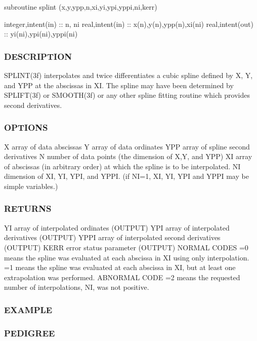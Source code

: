subroutine splint (x,y,ypp,n,xi,yi,ypi,yppi,ni,kerr)

integer,intent(in) \+:\+: n, ni real,intent(in) \+:\+: x(n),y(n),ypp(n),xi(ni) real,intent(out) \+:\+: yi(ni),ypi(ni),yppi(ni)

\subsubsection*{D\+E\+S\+C\+R\+I\+P\+T\+I\+ON}

S\+P\+L\+I\+N\+T(3f) interpolates and twice differentiates a cubic spline defined by X, Y, and Y\+PP at the abscissas in XI. The spline may have been determined by S\+P\+L\+I\+F\+T(3f) or S\+M\+O\+O\+T\+H(3f) or any other spline fitting routine which provides second derivatives.

\subsubsection*{O\+P\+T\+I\+O\+NS}

X array of data abscissas Y array of data ordinates Y\+PP array of spline second derivatives N number of data points (the dimension of X,Y, and Y\+PP) XI array of abscissas (in arbitrary order) at which the spline is to be interpolated. NI dimension of XI, YI, Y\+PI, and Y\+P\+PI. (if NI=1, XI, YI, Y\+PI and Y\+P\+PI may be simple variables.) \subsubsection*{R\+E\+T\+U\+R\+NS}

YI array of interpolated ordinates (O\+U\+T\+P\+UT) Y\+PI array of interpolated derivatives (O\+U\+T\+P\+UT) Y\+P\+PI array of interpolated second derivatives (O\+U\+T\+P\+UT) K\+E\+RR error status parameter (O\+U\+T\+P\+UT) N\+O\+R\+M\+AL C\+O\+D\+ES =0 means the spline was evaluated at each abscissa in XI using only interpolation. =1 means the spline was evaluated at each abscissa in XI, but at least one extrapolation was performed. A\+B\+N\+O\+R\+M\+AL C\+O\+DE =2 means the requested number of interpolations, NI, was not positive. \subsubsection*{E\+X\+A\+M\+P\+LE}

\subsubsection*{P\+E\+D\+I\+G\+R\+EE}

